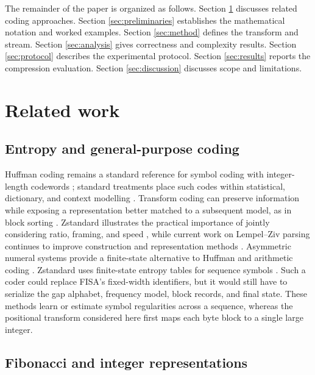 \documentclass[a4paper,fleqn]{cas-dc}
\begin{document}
The remainder of the paper is organized as follows. Section
\ref{sec:related} discusses related coding approaches. Section
\ref{sec:preliminaries} establishes the mathematical notation and worked
examples. Section \ref{sec:method} defines the transform and stream. Section
\ref{sec:analysis} gives correctness and complexity results. Section
\ref{sec:protocol} describes the experimental protocol. Section
\ref{sec:results} reports the compression evaluation. Section
\ref{sec:discussion} discusses scope and limitations.

\section{Related work}
\label{sec:related}

\subsection{Entropy and general-purpose coding}

Huffman coding remains a standard reference for symbol coding with
integer-length codewords \cite{Moffat2019Huffman}; standard treatments place
such codes within statistical, dictionary, and context modelling
\cite{Bell1990Text,Witten1999Managing}. Transform coding can preserve
information while exposing a representation better matched to a subsequent
model, as in block sorting \cite{Burrows1994BWT,Fenwick1996BWT}. Zstandard
illustrates the practical importance of jointly considering ratio, framing,
and speed \cite{Collet2021RFC8878}, while current work on Lempel--Ziv parsing
continues to improve construction and representation methods
\cite{Ellert2023LZ}.
Asymmetric numeral systems provide a finite-state alternative to Huffman and
arithmetic coding \cite{Duda2015ANS}. Zstandard uses finite-state entropy
tables for sequence symbols \cite{Collet2021RFC8878}. Such a coder could
replace FISA's fixed-width identifiers, but it would still have to serialize
the gap alphabet, frequency model, block records, and final state.
These methods learn or estimate symbol regularities across a sequence, whereas
the positional transform considered here first maps each byte block to a
single large integer.

\subsection{Fibonacci and integer representations}
\end{document}
